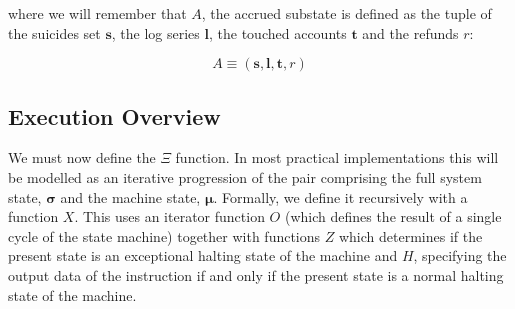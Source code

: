 \documentclass[9pt,oneside]{amsart}
\begin{document}
\begin{multicols}{2}
where we will remember that $A$, the accrued substate is defined as the tuple of the suicides set $\mathbf{s}$, the log series $\mathbf{l}$, the touched accounts $\mathbf{t}$ and the refunds $r$:

\begin{equation}
A \equiv (\mathbf{s}, \mathbf{l}, \mathbf{t}, r)
\end{equation}

\subsection{Execution Overview}

We must now define the $\Xi$ function. In most practical implementations this will be modelled as an iterative progression of the pair comprising the full system state, $\boldsymbol{\sigma}$ and the machine state, $\boldsymbol{\mu}$. Formally, we define it recursively with a function $X$. This uses an iterator function $O$ (which defines the result of a single cycle of the state machine) together with functions $Z$ which determines if the present state is an exceptional halting state of the machine and $H$, specifying the output data of the instruction if and only if the present state is a normal halting state of the machine.


\end{multicols}
\end{document}
